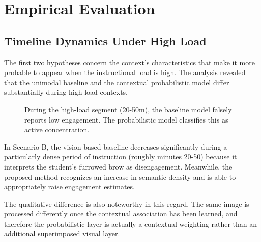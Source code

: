 \documentclass[conference]{IEEEtran}
\begin{document}
\section{Empirical Evaluation}

\subsection{Timeline Dynamics Under High Load}
The first two hypotheses concern the context’s characteristics that make it more probable to appear when the instructional load is high. The analysis revealed that the unimodal baseline and the contextual probabilistic model differ substantially during high-load contexts.

\begin{figure}[htbp]
\centering
{}
\caption{During the high-load segment (20-50m), the baseline model falsely reports low engagement. The probabilistic model classifies this as active concentration.}
\label{fig:results}
\end{figure}

In Scenario B, the vision-based baseline decreases significantly during a particularly dense period of instruction (roughly minutes 20-50) because it interprets the student's furrowed brow as disengagement. Meanwhile, the proposed method recognizes an increase in semantic density and is able to appropriately raise engagement estimates.

The qualitative difference is also noteworthy in this regard. The same image is processed differently once the contextual association has been learned, and therefore the probabilistic layer is actually a contextual weighting rather than an additional superimposed visual layer.
\end{document}
